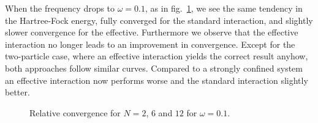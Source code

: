When the frequency drops to $\omega = 0.1$, as in fig.~\ref{fig:results:convN2OM01}, we see the same tendency in the Hartree-Fock energy, fully converged for the standard interaction, and slightly slower convergence for the effective.
Furthermore we observe that the effective interaction no longer leads to an improvement in convergence.
Except for the two-particle case, where an effective interaction yields the correct result anyhow, both approaches follow similar curves.
Compared to a strongly confined system an effective interaction now performs worse and the standard interaction slightly better.
\begin{figure}
\begin{center}
\caption{Relative convergence for $N=2$, $6$ and $12$ for $\omega =0.1$.}
\label{fig:results:convN2OM01}
\end{center}
\end{figure}


